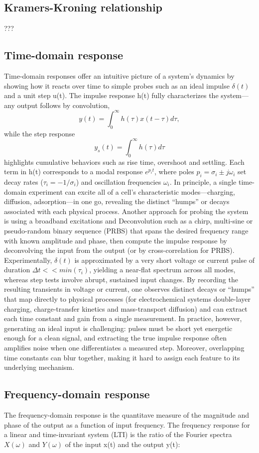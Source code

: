 \subsection{Kramers-Kroning relationship}
???

\subsection{Time-domain response}
Time-domain responses offer an intuitive picture of a system's dynamics by showing how it reacts over time to simple probes such as an ideal impulse $\delta(t)$ and a unit step u(t). The impulse response h(t) fully characterizes the system—any output follows by convolution,
$$
y(t)=\int _0 ^\infty h(\tau) x(t-\tau)d\tau,
$$
while the step response 
$$ 
y_s(t)=\int _0 ^\infty h(\tau)d\tau 
$$
highlights cumulative behaviors such as rise time, overshoot and settling. Each term in h(t) corresponds to a modal response $e^{p_i t}$, where poles $p_i=\sigma_i\pm j\omega_i$ set decay rates ($\tau_i=-1/\sigma_i$) and oscillation frequencies $\omega_i$.
In principle, a single time-domain experiment can excite all of a cell's characteristic modes—charging, diffusion, adsorption—in one go, revealing the distinct “humps” or decays associated with each physical process. Another approach for probing the system is using a broadband excitations and Deconvolution such as a chirp, multi-sine or pseudo-random binary sequence (PRBS) that spans the desired frequency range with known amplitude and phase, then compute the impulse response by deconvolving the input from the output (or by cross-correlation for PRBS).
Experimentally, $\delta(t)$ is approximated by a very short voltage or current pulse of duration $\Delta t << min(\tau_i)$, yielding a near-flat spectrum across all modes, whereas step tests involve abrupt, sustained input changes. By recording the resulting transients in voltage or current, one observes distinct decays or “humps” that map directly to physical processes (for electrochemical systems double-layer charging, charge-transfer kinetics and mass-transport diffusion) and can extract each time constant and gain from a single measurement. 
In practice, however, generating an ideal input is challenging: pulses must be short yet energetic enough for a clean signal, and extracting the true impulse response often amplifies noise when one differentiates a measured step. Moreover, overlapping time constants can blur together, making it hard to assign each feature to its underlying mechanism.

\subsection{Frequency-domain response}
The frequency-domain response is the quantitave measure of the magnitude and phase of the output as a function of input frequency. The frequency response for a linear and time-invariant system (LTI) is the ratio of the Fourier spectra $X(\omega)$ and $Y(\omega)$ of the input x(t) and the output y(t):

